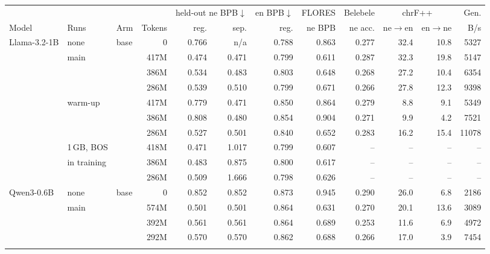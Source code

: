 \begin{table}[t]
\centering\footnotesize
\setlength{\tabcolsep}{3.5pt}
\begin{tabular}{lllrrrrrrrrr}
\toprule
 & & & & \multicolumn{2}{c}{held-out ne BPB$\downarrow$} & en BPB$\downarrow$ & FLORES & Belebele & \multicolumn{2}{c}{chrF++} & Gen. \\
\cmidrule(lr){5-6}\cmidrule(lr){10-11}
Model & Runs & Arm & Tokens & reg. & sep. & reg. & ne BPB & ne acc. & ne$\to$en & en$\to$ne & B/s \\
\midrule
Llama-3.2-1B & none & base & 0 & 0.766 & n/a & 0.788 & 0.863 & 0.277 & 32.4 & 10.8 & 5327 \\
 & main & \RO{} & 417M & 0.474 & 0.471 & 0.799 & 0.611 & 0.287 & 32.3 & 19.8 & 5147 \\
 &  & \RI{} & 386M & 0.534 & 0.483 & 0.803 & 0.648 & 0.268 & 27.2 & 10.4 & 6354 \\
 &  & \RII{} & 286M & 0.539 & 0.510 & 0.799 & 0.671 & 0.266 & 27.8 & 12.3 & 9398 \\
\addlinespace
 & warm-up & \RO{} & 417M & 0.779 & 0.471 & 0.850 & 0.864 & 0.279 & 8.8 & 9.1 & 5349 \\
 &  & \RI{} & 386M & 0.808 & 0.480 & 0.854 & 0.904 & 0.271 & 9.9 & 4.2 & 7521 \\
 &  & \RII{} & 286M & 0.527 & 0.501 & 0.840 & 0.652 & 0.283 & 16.2 & 15.4 & 11078 \\
\addlinespace
 & 1\,GB, BOS & \RO{} & 418M & 0.471 & 1.017 & 0.799 & 0.607 & -- & -- & -- & -- \\
 & in training & \RI{} & 386M & 0.483 & 0.875 & 0.800 & 0.617 & -- & -- & -- & -- \\
 &  & \RII{} & 286M & 0.509 & 1.666 & 0.798 & 0.626 & -- & -- & -- & -- \\
\addlinespace
\midrule
Qwen3-0.6B & none & base & 0 & 0.852 & 0.852 & 0.873 & 0.945 & 0.290 & 26.0 & 6.8 & 2186 \\
 & main & \RO{} & 574M & 0.501 & 0.501 & 0.864 & 0.631 & 0.270 & 20.1 & 13.6 & 3089 \\
 &  & \RI{} & 392M & 0.561 & 0.561 & 0.864 & 0.689 & 0.253 & 11.6 & 6.9 & 4972 \\
 &  & \RII{} & 292M & 0.570 & 0.570 & 0.862 & 0.688 & 0.266 & 17.0 & 3.9 & 7454 \\
\addlinespace
\bottomrule
\end{tabular}

\end{table}
